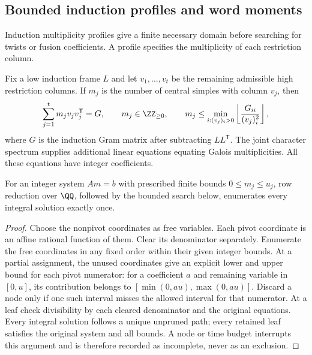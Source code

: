 \subsection{Bounded induction profiles and word moments}
\label{subsec:round4-quartic-profiles}
Induction multiplicity profiles give a finite necessary domain before
searching for twists or fusion coefficients. A profile specifies the
multiplicity of each restriction column.

Fix a low induction frame $L$ and let $v_1,\ldots,v_t$ be the remaining
admissible high restriction columns.  If $m_j$ is the number of central
simples with column $v_j$, then
\[
 \sum_{j=1}^t m_jv_jv_j^{\mathsf T}=G,
 \qquad m_j\in\ZZ_{\geq0},
 \qquad
 m_j\leq \min_{i:(v_j)_i>0}
       \left\lfloor\frac{G_{ii}}{(v_j)_i^2}\right\rfloor,
\]
where $G$ is the induction Gram matrix after subtracting $LL^{\mathsf T}$.
The joint character spectrum supplies additional linear equations equating
Galois multiplicities.  All these equations have integer coefficients.

\begin{proposition}
\label{prop:round4-affine-profile-enumeration}
For an integer system $Am=b$ with prescribed finite bounds
$0\leq m_j\leq u_j$, row reduction over $\QQ$, followed by the bounded
search below, enumerates every integral solution exactly once.
\end{proposition}
\begin{proof}
Choose the nonpivot coordinates as free variables.  Each pivot coordinate
is an affine rational function of them.  Clear its denominator separately.
Enumerate the free coordinates in any fixed order within their given
integer bounds.  At a partial assignment, the unused coordinates give an
explicit lower and upper bound for each pivot numerator: for a coefficient
$a$ and remaining variable in $[0,u]$, its contribution belongs to
$[\min(0,au),\max(0,au)]$.  Discard a node only if one such interval misses
the allowed interval for that numerator.  At a leaf check divisibility by
each cleared denominator and the original equations.  Every integral
solution follows a unique unpruned path; every retained leaf satisfies the
original system and all bounds.  A node or time budget interrupts this
argument and is therefore recorded as incomplete, never as an exclusion.
\end{proof}

